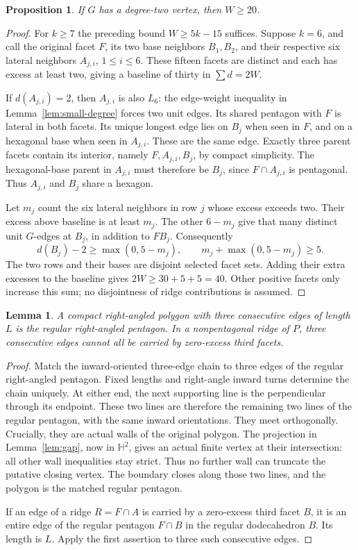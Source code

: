\documentclass[11pt]{article}
\newtheorem{lemma}[theorem]{Lemma}
\newtheorem{proposition}[theorem]{Proposition}
\theoremstyle{remark}
\newcommand{\HH}{\mathbb H}
\begin{document}
\begin{proposition}\label{prop:degree-two-twenty}
If $G$ has a degree-two vertex, then $W\ge20$.
\end{proposition}
\begin{proof}
For $k\ge7$ the preceding bound $W\ge5k-15$ suffices. Suppose
$k=6$, and call the original facet $F$, its two base neighbors
$B_1,B_2$, and their respective six lateral neighbors $A_{j,i}$,
$1\le i\le6$. These fifteen facets are distinct and each has
excess at least two, giving a baseline of thirty in $\sum d=2W$.

If $d(A_{j,i})=2$, then $A_{j,i}$ is also $L_6$: the edge-weight
inequality in Lemma~\ref{lem:small-degree} forces two unit edges.
Its shared pentagon with $F$ is lateral in both facets. Its unique
longest edge lies on $B_j$ when seen in $F$, and on a hexagonal
base when seen in $A_{j,i}$. These are the same edge. Exactly three
parent facets contain its interior, namely $F,A_{j,i},B_j$, by
compact simplicity. The hexagonal-base parent in $A_{j,i}$ must
therefore be $B_j$, since $F\cap A_{j,i}$ is pentagonal.
Thus $A_{j,i}$ and $B_j$ share a hexagon.

Let $m_j$ count the six lateral neighbors in row $j$ whose excess
exceeds two. Their excess above baseline is at least $m_j$.
The other $6-m_j$ give that many distinct unit $G$-edges at $B_j$,
in addition to $F B_j$. Consequently
\[
 d(B_j)-2\ge\max(0,5-m_j),\qquad
 m_j+\max(0,5-m_j)\ge5.
\]
The two rows and their bases are disjoint selected facet sets.
Adding their extra excesses to the baseline gives $2W\ge30+5+5=40$.
Other positive facets only increase this sum; no disjointness of
ridge contributions is assumed.
\end{proof}

\begin{lemma}\label{lem:three-edges}
A compact right-angled polygon with three consecutive edges of length
$L$ is the regular right-angled pentagon. In a nonpentagonal ridge
of $P$, three consecutive edges cannot all be carried by zero-excess
third facets.
\end{lemma}
\begin{proof}
Match the inward-oriented three-edge chain to three edges of the regular
right-angled pentagon. Fixed lengths and right-angle inward turns
determine the chain uniquely. At either end, the next supporting
line is the perpendicular through its endpoint. These two lines are
therefore the remaining two lines of the regular pentagon, with
the same inward orientations. They meet orthogonally. Crucially,
they are actual walls of the original polygon. The projection in
Lemma~\ref{lem:gap}, now in $\HH^2$, gives an actual finite vertex
at their intersection: all other wall inequalities stay strict.
Thus no further wall can truncate the putative closing vertex.
The boundary closes along those two lines, and the polygon is the
matched regular pentagon.

If an edge of a ridge $R=F\cap A$ is carried by a zero-excess third
facet $B$, it is an entire edge of the regular pentagon $F\cap B$
in the regular dodecahedron $B$. Its length is $L$. Apply the first
assertion to three such consecutive edges.
\end{proof}
\end{document}
